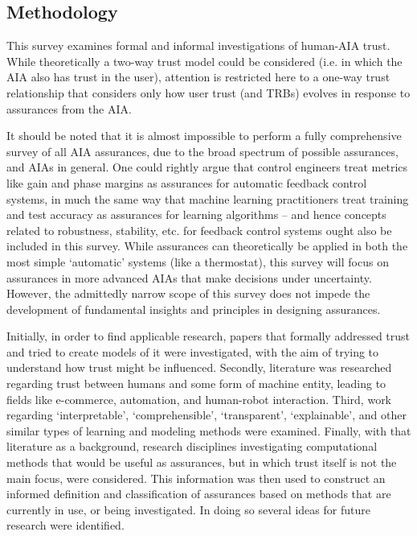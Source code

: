 \subsection{Methodology} \label{sec:methodology}
    This survey examines formal and informal investigations of human-AIA trust. While theoretically a two-way trust model could be considered (i.e. in which the AIA also has trust in the user), attention is restricted here to a one-way trust relationship that considers only how user trust (and TRBs) evolves in response to assurances from the AIA. 

    It should be noted that it is almost impossible to perform a fully comprehensive survey of all AIA assurances, due to the broad spectrum of possible assurances, and AIAs in general. One could rightly argue that control engineers treat metrics like gain and phase margins as assurances for automatic feedback control systems, in much the same way that  machine learning practitioners treat training and test accuracy as assurances for learning algorithms -- and hence concepts related to robustness, stability, etc. for feedback control systems ought also be included in this survey. While assurances can theoretically be applied in both the most simple `automatic' systems (like a thermostat), this survey will focus on assurances in more advanced AIAs that make decisions under uncertainty. However, the admittedly narrow scope of this survey does not impede the development of fundamental insights and principles in designing assurances.

    Initially, in order to find applicable research, papers that formally addressed trust and tried to create models of it were investigated, with the aim of trying to understand how trust might be influenced. Secondly, literature was researched regarding trust between humans and some form of machine entity, leading to fields like e-commerce, automation, and human-robot interaction. Third, work regarding `interpretable', `comprehensible', `transparent', `explainable', and other similar types of learning and modeling methods were examined. Finally, with that literature as a background, research disciplines investigating computational methods that would be useful as assurances, but in which trust itself is not the main focus, were considered. This information was then used to construct an informed definition and classification of assurances based on methods that are currently in use, or being investigated. In doing so several ideas for future research were identified.
